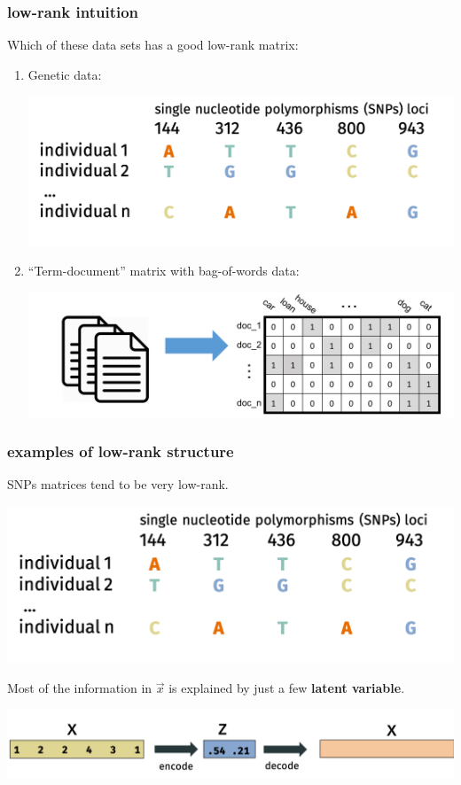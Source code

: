 \documentclass[handout,compress]{beamer}
\begin{document}
\begin{frame}
	\frametitle{low-rank intuition}
	Which of these data sets has a good low-rank matrix:
	\begin{enumerate}
		\item  Genetic data: 
		
		\begin{center}
		\includegraphics[width=.7\textwidth]{dna_data.png}
		\end{center}
		
		\item ``Term-document'' matrix with bag-of-words data:
		
		\begin{center}
			\includegraphics[width=.7\textwidth]{term_doc.png}
		\end{center}
	\end{enumerate}
\end{frame}

\begin{frame}
	\frametitle{examples of low-rank structure}
	SNPs matrices tend to be very low-rank.
	\begin{center}
		\includegraphics[width=.7\textwidth]{dna_data.png}
	\end{center}
Most of the information in $\vec{x}$ is explained by just a few \textbf{latent variable}. 
	\begin{center}
		\includegraphics[width=.7\textwidth]{gene_compression.png}
	\end{center}
\end{frame}
\end{document}
